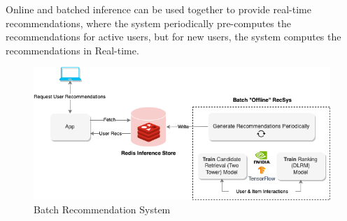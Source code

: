 Online and batched inference can be used together to provide real-time recommendations, where the system periodically pre-computes the recommendations for active users, but for new users, the system computes the recommendations in Real-time.



\begin{figure}[H]
    \centering
    \includegraphics[width=1\textwidth]{assets/batch-recommendation-system.png}
    \caption[Batch Recommendation System]{Batch Recommendation System \cite{NvidiaOfflineToOnline}}
    \label{fig:BatchRecSys}
\end{figure}